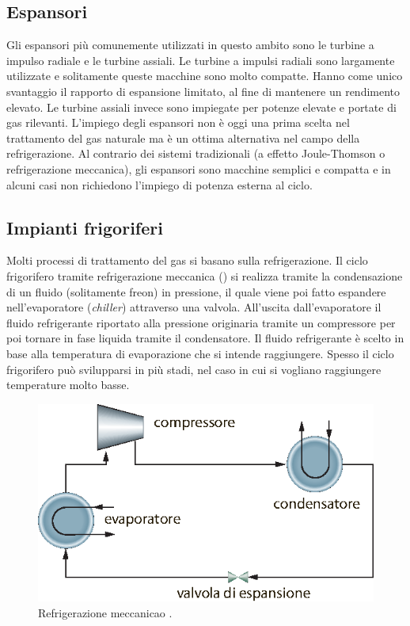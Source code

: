 \subsection{Espansori}
Gli espansori più comunemente utilizzati in questo ambito sono le turbine a impulso radiale e le turbine assiali. Le turbine a impulsi radiali sono largamente utilizzate e solitamente queste macchine sono molto compatte. Hanno come unico svantaggio il rapporto di espansione limitato, al fine di mantenere un rendimento elevato. Le turbine assiali invece sono impiegate per potenze elevate e portate di gas rilevanti. L'impiego degli espansori non è oggi una prima scelta nel trattamento del gas naturale ma è un ottima alternativa nel campo della refrigerazione. Al contrario dei sistemi tradizionali (a effetto Joule-Thomson o refrigerazione meccanica), gli espansori sono macchine semplici e compatta e in alcuni casi non richiedono l'impiego di potenza esterna al ciclo.

\subsection{Impianti frigoriferi}
Molti processi di trattamento del gas si basano sulla refrigerazione. Il ciclo frigorifero tramite refrigerazione meccanica () si realizza tramite la condensazione di un fluido (solitamente freon) in pressione, il quale viene poi fatto espandere nell'evaporatore (\textit{chiller}) attraverso una valvola. All'uscita dall'evaporatore il fluido refrigerante riportato alla pressione originaria tramite un compressore per poi tornare in fase liquida tramite il condensatore. Il fluido refrigerante è scelto in base alla temperatura di evaporazione che si intende raggiungere. Spesso il ciclo frigorifero può svilupparsi in più stadi, nel caso in cui si vogliano raggiungere temperature molto basse.

\begin{figure}[htbp]
    \centering
    \includegraphics[width=.5\textwidth]{fig/impianti/frigorifero.eps}
    \caption{Refrigerazione meccanicao \parencite{bianco2005impiantigas}.}
    \label{fig:frigorifero}
\end{figure}

